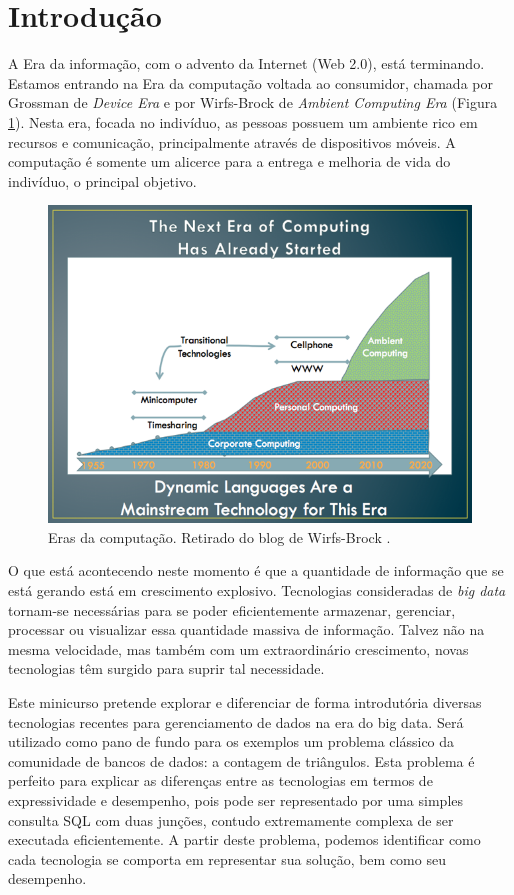 \section{Introdução}

A Era da informação, com o advento da Internet (Web 2.0), está terminando. Estamos entrando na
Era da computação voltada ao consumidor, chamada por Grossman de \textit{Device Era}
\citep{grossman2012structure} e por Wirfs-Brock de 
\emph{Ambient Computing Era} \citep{wirfsbrock2011blog} (Figura \ref{fig:ambientcomputing_era}). 
Nesta era, focada no indivíduo, as pessoas possuem um ambiente rico em recursos e comunicação, 
principalmente através de dispositivos móveis. A computação é somente um alicerce para a entrega 
e melhoria de vida do indivíduo, o principal objetivo.

\begin{figure}[h]
        \centering
        \includegraphics[width=0.7\linewidth]{3eras-medium.png}
        \caption{Eras da computação. Retirado do blog de Wirfs-Brock \citep{wirfsbrock2011blog}.}
        \label{fig:ambientcomputing_era}
\end{figure}


O que está acontecendo neste momento é que a quantidade de informação que se está gerando 
está em crescimento explosivo. Tecnologias consideradas de \emph{big data} tornam-se 
necessárias para se poder eficientemente armazenar, gerenciar, processar ou
visualizar essa quantidade massiva de informação. Talvez não na mesma velocidade, mas 
também com um extraordinário crescimento, novas tecnologias têm surgido para suprir tal
necessidade.

Este minicurso pretende explorar e diferenciar de forma introdutória diversas tecnologias recentes
para gerenciamento de dados na era do big data. Será utilizado como pano de fundo para os
exemplos um problema clássico da comunidade de bancos de dados: a contagem de triângulos.
Esta problema é perfeito para explicar as diferenças entre as tecnologias em termos de
expressividade e desempenho, pois pode ser representado por uma simples consulta SQL com
duas junções, contudo extremamente complexa de ser executada eficientemente. A partir deste
problema, podemos identificar como cada tecnologia se comporta em representar sua solução,
bem como seu desempenho. 

